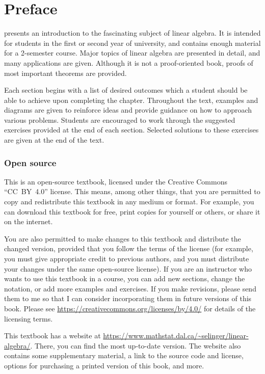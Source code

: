 \chapter*{Preface}

\textit{\bookfulltitle} presents an introduction to the fascinating
subject of linear algebra. It is intended for students in the first or
second year of university, and contains enough material for a
2-semester course. Major topics of linear algebra are presented in
detail, and many applications are given. Although it is not a
proof-oriented book, proofs of most important theorems are
provided. 

Each section begins with a list of desired outcomes which a student
should be able to achieve upon completing the chapter.  Throughout the
text, examples and diagrams are given to reinforce ideas and provide
guidance on how to approach various problems. Students are encouraged
to work through the suggested exercises provided at the end of each
section. Selected solutions to these exercises are given at the end of
the text.

\subsection*{Open source}

This is an open-source textbook, licensed under the Creative Commons
``CC~BY~4.0'' license. This means, among other things, that you are
permitted to copy and redistribute this textbook in any medium or
format. For example, you can download this textbook for free, print
copies for yourself or others, or share it on the internet.

You are also permitted to make changes to this textbook and distribute
the changed version, provided that you follow the terms of the license
(for example, you must give appropriate credit to previous authors,
and you must distribute your changes under the same open-source
license). If you are an instructor who wants to use this textbook in a
course, you can add new sections, change the notation, or add more
examples and exercises. If you make revisions, please send them to me
so that I can consider incorporating them in future versions of this
book. Please see \url{https://creativecommons.org/licenses/by/4.0/}
for details of the licensing terms.

This textbook has a website at
\url{https://www.mathstat.dal.ca/~selinger/linear-algebra/}.  There,
you can find the most up-to-date version. The website also contains
some supplementary material, a link to the source code and license,
options for purchasing a printed version of this book, and more.


